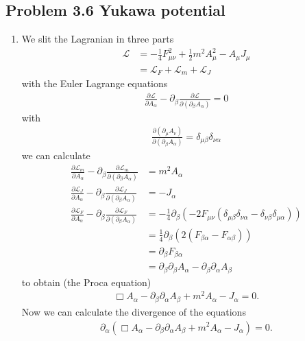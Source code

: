\documentclass[../main.tex]{subfiles}
\begin{document}
\subsection{Problem 3.6 Yukawa potential}
\begin{enumerate}[label=(\alph*)]
\item We slit the Lagranian in three parts
\begin{align}
\mathscr{L}&=-\frac{1}{4}F_{\mu\nu}^2+\frac{1}{2}m^2A_\mu^2-A_\mu J_\mu\\
&=\mathscr{L}_F+\mathscr{L}_m+\mathscr{L}_J
\end{align}
with the Euler Lagrange equations
\begin{align}
        \frac{\partial\mathscr{L}}{\partial A_\alpha}-\partial_\beta\frac{\partial\mathscr{L}}{\partial(\partial_\beta A_\alpha)}=0
\end{align}
with
\begin{align}
    \frac{\partial(\partial_\mu A_\nu)}{\partial(\partial_\beta A_\alpha)}=\delta_{\mu\beta}\delta_{\nu\alpha}
\end{align}
we can calculate
\begin{align}
    \frac{\partial\mathscr{L}_m}{\partial A_\alpha}-\partial_\beta\frac{\partial\mathscr{L}_m}{\partial(\partial_\beta A_\alpha)}&=m^2A_\alpha\\
    \frac{\partial\mathscr{L}_J}{\partial A_\alpha}-\partial_\beta\frac{\partial\mathscr{L}_J}{\partial(\partial_\beta A_\alpha)}&=-J_\alpha\\
    \frac{\partial\mathscr{L}_F}{\partial A_\alpha}-\partial_\beta\frac{\partial\mathscr{L}_F}{\partial(\partial_\beta A_\alpha)}&=-\frac{1}{4}\partial_\beta\left(-2F_{\mu\nu}(\delta_{\mu\beta}\delta_{\nu\alpha}-\delta_{\nu\beta}\delta_{\mu\alpha})\right)\\
    &=\frac{1}{4}\partial_\beta\left(2(F_{\beta\alpha}-F_{\alpha\beta})\right)\\
    &=\partial_\beta F_{\beta\alpha}\\
    &=\partial_\beta\partial_\beta A_\alpha-\partial_\beta\partial_\alpha A_\beta
\end{align}
to obtain (the Proca equation)
\begin{align}
    \Box A_\alpha-\partial_\beta\partial_\alpha A_\beta+m^2A_\alpha-J_\alpha=0.
\end{align}
Now we can calculate the divergence of the equations
\begin{align}
    \partial_\alpha\left(\Box A_\alpha-\partial_\beta\partial_\alpha A_\beta+m^2A_\alpha-J_\alpha\right)=0.\\

\end{align}
\end{enumerate}
\end{document}
